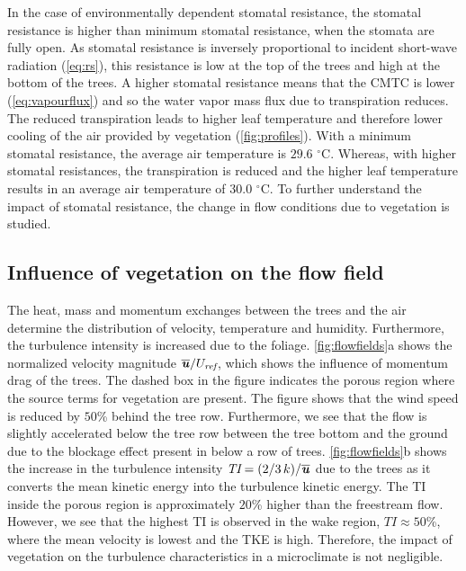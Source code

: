 In the case of environmentally dependent stomatal resistance, the stomatal resistance is higher than minimum stomatal resistance, when the stomata are fully open. As stomatal resistance is inversely proportional to incident short-wave radiation (\cref{eq:rs}), this resistance is low at the top of the trees and high at the bottom of the trees. A higher stomatal resistance means that the CMTC is lower (\cref{eq:vapourflux}) and so the water vapor mass flux due to transpiration reduces. The reduced transpiration leads to higher leaf temperature and therefore lower cooling of the air provided by vegetation (\cref{fig:profiles}). With a minimum stomatal resistance, the average air temperature is $29.6$ $^{\circ}$C. Whereas, with higher stomatal resistances, the transpiration is reduced and the higher leaf temperature results in an average air temperature of $30.0$ $^{\circ}$C. To further understand the impact of stomatal resistance, the change in flow conditions due to vegetation is studied.

\subsection{Influence of vegetation on the flow field}

The heat, mass and momentum exchanges between the trees and the air determine the distribution of velocity, temperature and humidity. Furthermore, the turbulence intensity is increased due to the foliage. \cref{fig:flowfields}a shows the normalized velocity magnitude $\overline{\textbf{\textit{u}}}/U_{\textit{ref}}$, which shows the influence of momentum drag of the trees. The dashed box in the figure indicates the porous region where the source terms for vegetation are present. The figure shows that the wind speed is reduced by $50$\% behind the tree row. Furthermore, we see that the flow is slightly accelerated below the tree row between the tree bottom and the ground due to the blockage effect present in below a row of trees. \cref{fig:flowfields}b shows the increase in the turbulence intensity $\textit{TI}=(2/3\,k)/\overline{\textbf{\textit{u}}}$ due to the trees as it converts the mean kinetic energy into the turbulence kinetic energy. The TI inside the porous region is approximately $20$\% higher than the freestream flow. However, we see that the highest TI is observed in the wake region, $TI\approx50$\%, where the mean velocity is lowest and the TKE is high. Therefore, the impact of vegetation on the turbulence characteristics in a microclimate is not negligible. 

